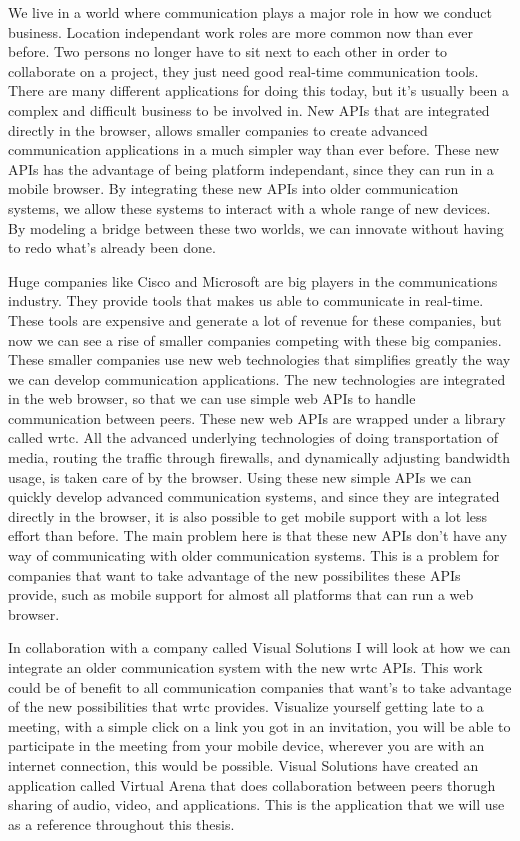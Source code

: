 We live in a world where communication plays a major role in how we conduct business. Location independant work roles are more common now than ever before. Two persons no longer have to sit next to each other in order to collaborate on a project, they just need good real-time communication tools. There are many different applications for doing this today, but it's usually been a complex and difficult business to be involved in. New APIs that are integrated directly in the browser, allows smaller companies to create advanced communication applications in a much simpler way than ever before. These new APIs has the advantage of being platform independant, since they can run in a mobile browser. By integrating these new APIs into older communication systems, we allow these systems to interact with a whole range of new devices. By modeling a bridge between these two worlds, we can innovate without having to redo what's already been done.

Huge companies like Cisco and Microsoft are big players in the communications industry. They provide tools that makes us able to communicate in real-time. These tools are expensive and generate a lot of revenue for these companies, but now we can see a rise of smaller companies competing with these big companies. These smaller companies use new web technologies that simplifies greatly the way we can develop communication applications. The new technologies are integrated in the web browser, so that we can use simple web APIs to handle communication between peers. These new web APIs are wrapped under a library called \gls{wrtc}. All the advanced underlying technologies of doing transportation of media, routing the traffic through firewalls, and dynamically adjusting bandwidth usage, is taken care of by the browser. Using these new simple APIs we can quickly develop advanced communication systems, and since they are integrated directly in the browser, it is also possible to get mobile support with a lot less effort than before. The main problem here is that these new APIs don't have any way of communicating with older communication systems. This is a problem for companies that want to take advantage of the new possibilites these APIs provide, such as mobile support for almost all platforms that can run a web browser.

In collaboration with a company called Visual Solutions I will look at how we can integrate an older communication system with the new \gls{wrtc} APIs. This work could be of benefit to all communication companies that want's to take advantage of the new possibilities that \gls{wrtc} provides. Visualize yourself getting late to a meeting, with a simple click on a link you got in an invitation, you will be able to participate in the meeting from your mobile device, wherever you are with an internet connection, this would be possible. Visual Solutions have created an application called Virtual Arena that does collaboration between peers thorugh sharing of audio, video, and applications. This is the application that we will use as a reference throughout this thesis.


